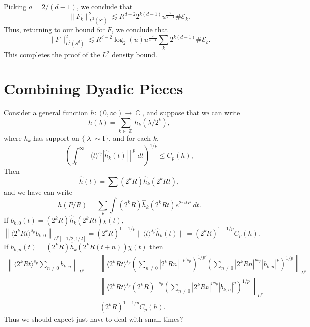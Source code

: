 \documentclass[dvipsnames,letterpaper,12pt]{article}
\DeclareMathOperator{\ZZ}{\mathbb{Z}}
\DeclareMathOperator{\CC}{\mathbb{C}}
\begin{document}
%
Picking $a = 2 / (d-1)$, we conclude that
%
\[ \| F_k \|_{L^2(S^d)}^2 \lesssim R^{d-2} 2^{k(d-1)} u^{\frac{2}{d-1}} \# \mathcal{E}_k. \]
%
Thus, returning to our bound for $F$, we conclude that
%
\[ \| F \|_{L^2(S^d)}^2 \lesssim R^{d-2} \log_2(u) u^{\frac{2}{d-1}} \sum_k  2^{k(d-1)} \# \mathcal{E}_k. \]  
%
This completes the proof of the $L^2$ density bound.


\section{Combining Dyadic Pieces}

Consider a general function $h: (0,\infty) \to \CC$, and suppose that we can write
%
%
\[ h(\lambda) = \sum_{k \in \ZZ} h_k(\lambda / 2^k), \]
%
where $h_k$ has support on $\{ |\lambda| \sim 1 \}$, and for each $k$,
\[ \left( \int_0^\infty \left[ \langle t \rangle^{s_p} |\widehat{h}_k(t)| \right]^p\; dt \right)^{1/p} \leq C_p(h), \]
%
Then
%
\[ \widehat{h}(t) = \sum (2^k R) \widehat{h}_k(2^k R t), \]
%
and we have can write
%
\[ h(P/R) = \sum_k \int (2^k R) \widehat{h}_k(2^k R t) e^{2 \pi i t P}\; dt. \]
%
%
If $b_{k,0}(t) = (2^k R) \widehat{h}_k(2^k R t) \chi(t)$,
%
\[ \left\| \langle 2^k R t \rangle^{s_p} b_{k,0} \right\|_{L^p[-1/2,1/2]} = (2^k R)^{1 - 1/p} \| \langle t \rangle^{s_p} \widehat{h}_k(t) \| = (2^k R)^{1 - 1/p} C_p(h). \]
%
If $b_{k,n}(t) = (2^k R) \widehat{h}_k(2^k R (t + n)) \chi(t)$ then
%
\begin{align*}
    \left\| \langle 2^k R t \rangle^{s_p} \sum_{n \neq 0} b_{k,n} \right\|_{L^p} &= \left\| \langle 2^k R t \rangle^{s_p} \left( \sum_{n \neq 0} |2^k R n|^{-p' s_p} \right)^{1/p'} \left( \sum_{n \neq 0} |2^k R n|^{p s_p} |b_{k,n}|^p \right)^{1/p} \right\|_{L^p}\\
    &= \left\| \langle 2^k R t \rangle^{s_p} (2^k R)^{-s_p} \left( \sum_{n \neq 0} |2^k R n|^{p s_p} |b_{k,n}|^p \right)^{1/p} \right\|_{L^p}\\
    &= (2^k R)^{1 - 1/p} C_p(h).
\end{align*}
%
Thus we should expect just have to deal with small times?
\end{document}
